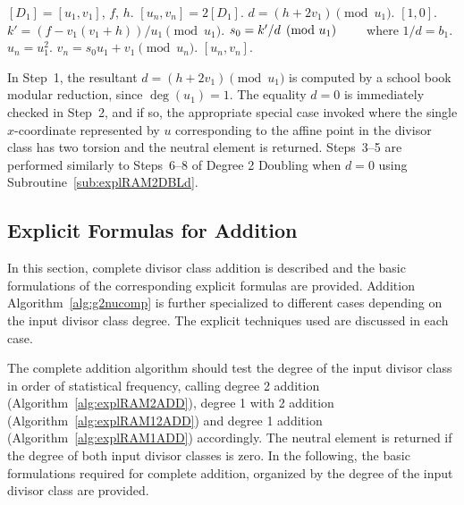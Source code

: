 \begin{algorithm}[htbp]
\caption{Genus 2 Ramified Model Degree 1 Doubling\label{alg:explRAM1DBL}}
\begin{algorithmic} [1]
\Require $[D_1] = [u_1,v_1]$, $f$, $h$.  \smallskip
\Ensure $[u_n,v_n] = 2[D_1]$.
\algrule
\State $d = (h + 2v_1) \pmod{u_1}$.
 \Return $[1,0]$.
\EndIf
\State $k' = (f - v_1(v_1 + h))/u_1 \pmod{u_1}$.
\State $s_0 = k'/d \pmod{u_1} \quad\quad$ where $1/d = b_1$.
\State $u_n = u_1^2$.
\State $v_n = s_0u_1 + v_1  \pmod{u_n}.$
\State \Return $[u_n,v_n]$.
\end{algorithmic}
\end{algorithm}

In Step~1, the resultant $d = (h + 2v_1) \pmod{u_1}$ is computed by a school
book modular reduction, since $\deg(u_1) = 1$. The equality $d = 0$ is
immediately checked in Step~2, and if so, the appropriate special case invoked
where the single $x$-coordinate represented by $u$ corresponding to the affine
point in the divisor class has two torsion and the neutral element is returned.
Steps~3--5 are performed similarly to Steps~6--8 of Degree 2 Doubling when $d=0$ using
Subroutine~\ref{sub:explRAM2DBLd}.


\subsection{Explicit Formulas for Addition}\label{sec:g2RAMADD}
In this section, complete divisor class addition is described and the basic
formulations of the corresponding explicit formulas are provided. Addition
Algorithm~\ref{alg:g2nucomp} is further specialized to different cases
depending on the input divisor class degree. The explicit techniques used are
discussed in each case. 

The complete addition algorithm should test the degree of the input divisor
class in order of statistical frequency, calling degree 2 addition
(Algorithm~\ref{alg:explRAM2ADD}), degree 1 with 2 addition
(Algorithm~\ref{alg:explRAM12ADD}) and degree 1 addition
(Algorithm~\ref{alg:explRAM1ADD}) accordingly. The neutral element is returned
if the degree of both input divisor classes is zero.  In the following, the
basic formulations required for complete addition, organized by the degree of
the input divisor class are provided.

